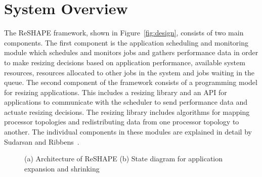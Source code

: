 \documentclass[letterpaper]{llncs}
\newcommand{\reshape}{ReSHAPE}
\begin{document}
\begin{comment}
The Caterpillar algorithm by Prylli et al.~\cite{prylli}
is the closest related work to our algorithm in that it
supports data redistribution across a  checkerboard processor topology.
In our research, we extend the ideas by Lim et al.~\cite{Lim97}and Park et al.~\cite{park} to develop an
algorithm to redistribute two-dimensional block-cyclic data
distributed across a 2-D processor grid topology.
Our work is contrary to  Desprez et al.~\cite{desprez98scheduling} where they
assume that there is no overlap among processors in the
source and destination processor set. Our algorithm builds an efficient
communication schedule and uses non-all-to-all communication
for data redistribution. We apply row and column transformations using the
circulant matrix formalism to minimize
node contentions in the communication schedule.
\end{comment}

\section{System Overview}
\label{sec:systemoverview}
The \reshape{} framework, shown in Figure~\ref{fig:design}{}, consists of two main components. The first component is the application scheduling and monitoring module which schedules and monitors jobs and gathers performance data in order to make resizing decisions based on application performance, available system resources, resources allocated to other jobs in the system and jobs waiting in the queue.
The second component of the framework consists of a programming model for resizing applications.  This includes a resizing library and an API for applications to communicate with the scheduler to send performance data and actuate resizing decisions. The resizing library includes algorithms for mapping processor topologies and redistributing data from one processor topology to another. The individual components in these modules are explained in detail by Sudarsan and Ribbens~\cite{reportRajeshCorr}.
\begin{figure}[t]
\begin{center}
\caption{(a) Architecture of \reshape{} (b) State diagram for app\-lication ex\-pansion and shrinking
}
\end{center}
\end{figure}
\end{document}
